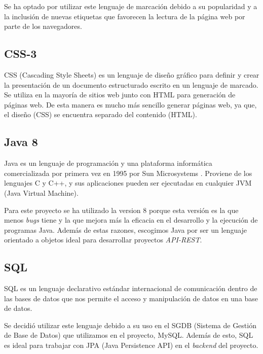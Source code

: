     Se ha optado por utilizar este lenguaje de marcación debido a su popularidad y a la inclusión de nuevas etiquetas que favorecen la lectura de la página web por parte de los navegadores.
    \newline
    
    \subsection{CSS-3}
    CSS\cite{css} (Cascading Style Sheets) es un lenguaje de diseño gráfico para definir y crear la presentación de un documento estructurado escrito en un lenguaje de marcado. Se utiliza en la mayoría de sitios web junto con HTML para generación de páginas web. De esta manera es mucho más sencillo generar páginas web, ya que, el diseño (CSS) se encuentra separado del contenido (HTML). \newline

    \subsection{Java 8}
    Java\cite{java} es un lenguaje de programación y una plataforma informática comercializada por primera vez en 1995 por Sun Microsystems\cite{sun} . Proviene de los lenguajes C y C++, y sus aplicaciones pueden ser ejecutadas en cualquier JVM (Java Virtual Machine).
    \newline
    
    Para este proyecto se ha utilizado la version 8 porque esta versión es la que menos \textit{bugs} tiene y la que mejora más la eficacia en el desarrollo y la ejecución de programas Java\cite{java8}. Además de estas razones, escogimos Java por ser un lenguaje orientado a objetos ideal para desarrollar proyectos \textit{API-REST}.
    
    \subsection{SQL}
    SQL\cite{sql} es un lenguaje declarativo estándar internacional de comunicación dentro de las bases de datos que nos permite el acceso y manipulación de datos en una base de datos.
    \newline
    
    Se decidió utilizar este lenguaje debido a su uso en el SGDB (Sistema de Gestión de Base de Datos) que utilizamos en el proyecto, MySQL. Además de esto, SQL es ideal para trabajar con JPA (Java Persistence API) en el \textit{backend} del proyecto.
    

